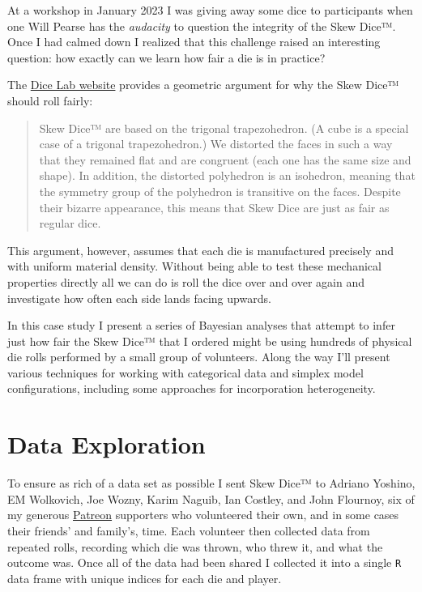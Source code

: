 \documentclass[
  letterpaper,
  DIV=11,
  numbers=noendperiod]{scrartcl}
\begin{document}
At a workshop in January 2023 I was giving away some dice to
participants when one Will Pearse has the \emph{audacity} to question
the integrity of the Skew Dice™. Once I had calmed down I realized that
this challenge raised an interesting question: how exactly can we learn
how fair a die is in practice?

The
\href{https://www.mathartfun.com/thedicelab.com/DiceDesign.html}{Dice
Lab website} provides a geometric argument for why the Skew Dice™ should
roll fairly:

\begin{quote}
Skew Dice™ are based on the trigonal trapezohedron. (A cube is a special
case of a trigonal trapezohedron.) We distorted the faces in such a way
that they remained flat and are congruent (each one has the same size
and shape). In addition, the distorted polyhedron is an isohedron,
meaning that the symmetry group of the polyhedron is transitive on the
faces. Despite their bizarre appearance, this means that Skew Dice are
just as fair as regular dice.
\end{quote}

This argument, however, assumes that each die is manufactured precisely
and with uniform material density. Without being able to test these
mechanical properties directly all we can do is roll the dice over and
over again and investigate how often each side lands facing upwards.

In this case study I present a series of Bayesian analyses that attempt
to infer just how fair the Skew Dice™ that I ordered might be using
hundreds of physical die rolls performed by a small group of volunteers.
Along the way I'll present various techniques for working with
categorical data and simplex model configurations, including some
approaches for incorporation heterogeneity.

\section{Data Exploration}\label{data-exploration}

To ensure as rich of a data set as possible I sent Skew Dice™ to Adriano
Yoshino, EM Wolkovich, Joe Wozny, Karim Naguib, Ian Costley, and John
Flournoy, six of my generous
\href{https://www.patreon.com/betanalpha}{Patreon} supporters who
volunteered their own, and in some cases their friends' and family's,
time. Each volunteer then collected data from repeated rolls, recording
which die was thrown, who threw it, and what the outcome was. Once all
of the data had been shared I collected it into a single \texttt{R} data
frame with unique indices for each die and player.
\end{document}
